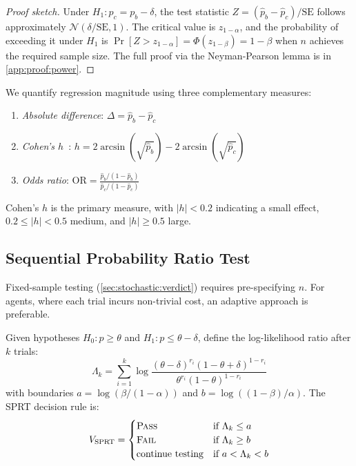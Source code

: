 \begin{proof}[Proof sketch]
Under $H_1: p_c = p_b - \delta$, the test statistic
$Z = (\hat{p}_b - \hat{p}_c) / \text{SE}$ follows approximately
$\mathcal{N}(\delta / \text{SE}, 1)$. The critical value is
$z_{1-\alpha}$, and the probability of exceeding it under $H_1$ is
$\Pr[Z > z_{1-\alpha}] = \Phi(z_{1-\beta}) = 1-\beta$ when $n$ achieves
the required sample size. The full proof via the Neyman-Pearson lemma is
in \cref{app:proof:power}.
\end{proof}

\begin{definition}
\label{def:effect-size}
We quantify regression magnitude using three complementary measures:
\begin{enumerate}[leftmargin=*]
  \item \emph{Absolute difference}: $\Delta = \hat{p}_b - \hat{p}_c$
  \item \emph{Cohen's $h$}~\citep{cohen1988statistical}:
    $h = 2\arcsin(\sqrt{\hat{p}_b}) - 2\arcsin(\sqrt{\hat{p}_c})$
  \item \emph{Odds ratio}: $\text{OR} = \frac{\hat{p}_b / (1-\hat{p}_b)}
    {\hat{p}_c / (1-\hat{p}_c)}$
\end{enumerate}
Cohen's $h$ is the primary measure, with $|h| < 0.2$ indicating a small
effect, $0.2 \leq |h| < 0.5$ medium, and $|h| \geq 0.5$ large.
\end{definition}

\subsection{Sequential Probability Ratio Test}
\label{sec:stochastic:sprt}

Fixed-sample testing (\cref{sec:stochastic:verdict}) requires
pre-specifying $n$. For agents, where each trial incurs non-trivial cost,
an adaptive approach is preferable.

\begin{definition}
\label{def:sprt}
Given hypotheses $H_0: p \geq \theta$ and $H_1: p \leq \theta - \delta$,
define the log-likelihood ratio after $k$ trials:
\begin{equation}
\label{eq:sprt-llr}
  \Lambda_k = \sum_{i=1}^{k} \log \frac{
    (\theta - \delta)^{r_i} (1 - \theta + \delta)^{1-r_i}
  }{
    \theta^{r_i} (1-\theta)^{1-r_i}
  }
\end{equation}
with boundaries $a = \log(\beta / (1-\alpha))$ and
$b = \log((1-\beta)/\alpha)$. The SPRT decision rule is:
\begin{equation}
\label{eq:sprt-rule}
  V_{\text{SPRT}} =
  \begin{cases}
    \textsc{Pass} & \text{if } \Lambda_k \leq a \\
    \textsc{Fail} & \text{if } \Lambda_k \geq b \\
    \text{continue testing} & \text{if } a < \Lambda_k < b
  \end{cases}
\end{equation}
\end{definition}


